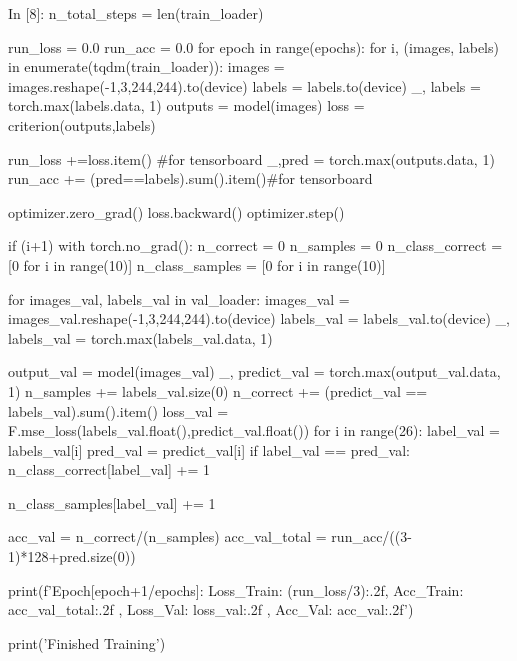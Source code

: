\documentclass[12pt, a4paper]{article}
\begin{document}
\begin{python}
In [8]:
n_total_steps = len(train_loader)

run_loss = 0.0
run_acc = 0.0
for epoch in range(epochs):
    for i, (images, labels) in enumerate(tqdm(train_loader)):
        images = images.reshape(-1,3,244,244).to(device)
        labels = labels.to(device)
        _, labels = torch.max(labels.data, 1)
        outputs = model(images)
        loss = criterion(outputs,labels)
        
        run_loss +=loss.item() #for tensorboard
        _,pred = torch.max(outputs.data, 1)
        run_acc += (pred==labels).sum().item()#for tensorboard
        
        optimizer.zero_grad()
        loss.backward()
        optimizer.step()
        
        if (i+1) %
            with torch.no_grad():
                n_correct = 0
                n_samples = 0
                n_class_correct = [0 for i in range(10)]
                n_class_samples = [0 for i in range(10)]
                
                for images_val, labels_val in val_loader:
                    images_val = images_val.reshape(-1,3,244,244).to(device)
                    labels_val = labels_val.to(device)
                    _, labels_val = torch.max(labels_val.data, 1)
                    
                    output_val = model(images_val)
                    _, predict_val = torch.max(output_val.data, 1)
                    n_samples += labels_val.size(0)
                    n_correct += (predict_val == labels_val).sum().item()
                    loss_val = F.mse_loss(labels_val.float(),predict_val.float())
                    for i in range(26):
                        label_val = labels_val[i]
                        pred_val = predict_val[i]
                        if label_val == pred_val:
                            n_class_correct[label_val] += 1
                            
                        n_class_samples[label_val] += 1
                       
                acc_val = n_correct/(n_samples)
                acc_val_total = run_acc/((3-1)*128+pred.size(0))

                print(f'Epoch[{epoch+1}/{epochs}]:  Loss_Train: {(run_loss/3):.2f}, Acc_Train: {acc_val_total:.2f} , Loss_Val: {loss_val:.2f} , Acc_Val: {acc_val:.2f}')
            
print('Finished Training')
\end{python}
\end{document}
